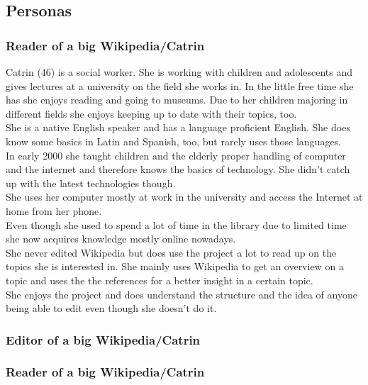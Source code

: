 \documentclass[11pt]{article}
\begin{document}
\subsection{Personas}

\subsubsection{Reader of a big Wikipedia/Catrin}
Catrin (46) is a social worker. She is working with children and adolescents and gives lectures at a university on the field she works in. In the little free time she has she enjoys reading and going to museums. Due to her children majoring in different fields she enjoys keeping up to date with their topics, too. \\
She is a native English speaker and has a language proficient English. She does know some basics in Latin and Spanish, too, but rarely uses those languages. \\
In early 2000 she taught children and the elderly proper handling of computer and the internet and therefore knows the basics of technology. She didn't catch up with the latest technologies though. \\
She uses her computer mostly at work in the university and access the Internet at home from her phone. \\
Even though she used to spend a lot of time in the library due to limited time she now acquires knowledge mostly online nowadays. \\
She never edited Wikipedia but does use the project a lot to read up on the topics she is interested in. She mainly uses Wikipedia to get an overview on a topic and uses the the references for a better insight in a certain topic. \\
She enjoys the project and does understand the structure and the idea of anyone being able to edit even though she doesn't do it. \\

\subsubsection{Editor of a big Wikipedia/Catrin}



\subsubsection{Reader of a big Wikipedia/Catrin}
\end{document}
